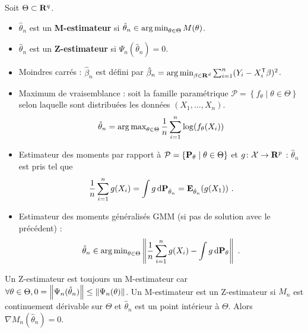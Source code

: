 	\begin{defn}
		Soit $\Theta \subset \mathbf{R}^q$.
		\begin{itemize}
			\item[\textbullet] $\hat{\theta}_n$ est un \textbf{M-estimateur} si $\hat{\theta}_n \in \operatorname{arg\, min}_{\theta \in \Theta} M(\theta)$.
			\item[\textbullet] $\hat{\theta}_n$ est un \textbf{Z-estimateur} si $\Psi_n(\hat{\theta}_n) = 0$.
		\end{itemize}
	\end{defn}
	
	\begin{ex}
		\begin{itemize}
			\item[\textbullet] Moindres carrés : $\hat{\beta}_n$ est défini par $\hat{\beta}_n = \operatorname{arg\, min}_{\beta \in \mathbf{R}^d} \sum_{i = 1}^n (Y_i - X_i^\mathsf{T}\beta)^2$.
			\item[\textbullet] Maximum de vraisemblance : soit la famille paramétrique $\mathcal{P} = \left\{ f_{\theta} \mid \theta \in \Theta \right\}$ selon laquelle sont distribuées les données $(X_1,\ldots,X_n)$.
				\vspace{-0.4em}
				$$\hat{\theta}_n = \operatorname{arg\, max}_{\theta \in \Theta} \frac{1}{n} \sum_{i = 1}^n \log(f_{\theta}(X_i))$$
				\vspace{-0.4em}
			\item[\textbullet] Estimateur des moments par rapport à $\mathcal{P} = \left\{ \mathbf{P}_{\theta} \mid \theta \in \Theta \right\}$ et $g \colon \mathcal{X} \to \mathbf{R}^p$ : $\hat{\theta}_n$ est pris tel que
			$$\frac{1}{n} \sum_{i = 1}^n g(X_i) = \int g \mathop{}\mathopen{}\mathrm{d} \mathbf{P}_{\hat{\theta}_n} = \mathbf{E}_{\hat{\theta}_n}(g(X_1))\ .$$
			\item[\textbullet] Estimateur des moments généralisés GMM (si pas de solution avec le précédent) :
			$$\hat{\theta}_n \in \operatorname{arg\, min}_{\theta \in \Theta} \left\lVert \frac{1}{n}\sum_{i = 1}^n g(X_i) - \int g \mathop{}\mathopen{}\mathrm{d} \mathbf{P}_\theta \right\rVert\ .$$
		\end{itemize}
	\end{ex}

	\begin{rem}
		Un Z-estimateur est toujours un M-estimateur car $\forall \theta \in \Theta, 0 = \left\lVert\Psi_n(\hat{\theta}_n)\right\rVert \leq \left\lVert\Psi_n(\theta)\right\rVert$.
		Un M-estimateur est un Z-estimateur si $M_n$ est continuement dérivable sur $\Theta$ et $\hat{\theta}_n$ est un point intérieur à $\Theta$.
		Alors $\nabla M_n(\hat{\theta}_n) = 0$.
	\end{rem}

